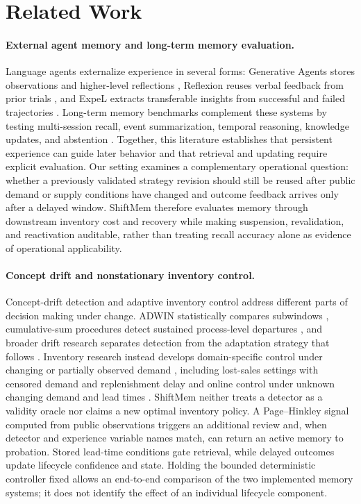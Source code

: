 \section{Related Work}
\label{sec:related-work}

\paragraph{External agent memory and long-term memory evaluation.}
Language agents externalize experience in several forms: Generative Agents stores
observations and higher-level reflections \citep{park2023generative}, Reflexion
reuses verbal feedback from prior trials \citep{shinn2023reflexion}, and ExpeL
extracts transferable insights from successful and failed trajectories
\citep{zhao2023expel}. Long-term memory benchmarks complement these systems by
testing multi-session recall, event summarization, temporal reasoning, knowledge
updates, and abstention \citep{maharana2024locomo,wu2025longmemeval}. Together,
this literature establishes that persistent experience can guide later behavior
and that retrieval and updating require explicit evaluation. Our setting examines
a complementary operational question: whether a previously validated strategy
revision should still be reused after public demand or supply conditions have
changed and outcome feedback arrives only after a delayed window. ShiftMem
therefore evaluates memory through downstream inventory cost and recovery while
making suspension, revalidation, and reactivation auditable, rather than treating
recall accuracy alone as evidence of operational applicability.

\paragraph{Concept drift and nonstationary inventory control.}
Concept-drift detection and adaptive inventory control address different parts of
decision making under change. ADWIN statistically compares subwindows
\citep{bifet2007adwin}, cumulative-sum procedures detect sustained process-level
departures \citep{page1954continuous}, and broader drift research separates
detection from the adaptation strategy that follows \citep{gama2014survey}.
Inventory research instead develops domain-specific control under changing or
partially observed demand \citep{treharne2002adaptive,bayraktar2010inventory},
including lost-sales settings with censored demand and replenishment delay
\citep{zipkin2008old} and online control under unknown changing demand and lead
times \citep{amiri2026nonstationary}. ShiftMem neither treats a detector as a
validity oracle nor claims a new optimal inventory policy. A Page--Hinkley signal
computed from public observations triggers an additional review and, when
detector and experience variable names match, can return an active memory to
probation. Stored lead-time conditions gate retrieval, while delayed outcomes
update lifecycle confidence and state. Holding the bounded deterministic
controller fixed allows an end-to-end comparison of the two implemented memory
systems; it does not identify the effect of an individual lifecycle component.

